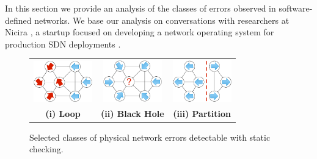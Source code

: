 
In this section we provide an analysis of the classes of errors observed in
software-defined networks. We base our analysis on conversations with
researchers at Nicira \cite{Nicira}, a startup focused on developing a network operating
system for production SDN deployments \cite{Onix}.

\begin{figure}[t]
    \centering
    \begin{tabular}{ccc}
    \hspace{-3pt}\includegraphics[width=1in]{../diagrams/bugs/loop.pdf}&
    \includegraphics[width=1in]{../diagrams/bugs/dead_end.pdf}&
    \includegraphics[width=1in]{../diagrams/bugs/partition.pdf}\\
    {\bf (i) Loop}&{\bf (ii) Black Hole}&{\bf (iii) Partition}\\
    \end{tabular}
    \caption[]{\label{fig:loop} Selected classes of physical network errors detectable with static
    checking.\vspace{-10pt}} 
\end{figure}


